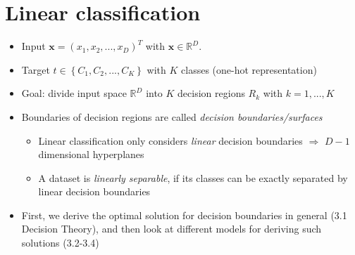 \section{Linear classification}
\begin{itemize}
	\item Input $\bm{x}=\left(x_1, x_2, ..., x_D\right)^T$ with $\bm{x}\in\mathbb{R}^D$.
	\item Target $t\in\left\{C_1, C_2, ..., C_K\right\}$ with $K$ classes (one-hot representation)
	\item Goal: divide input space $\mathbb{R}^D$ into $K$ decision regions $R_k$ with $k=1,...,K$
	\item Boundaries of decision regions are called \textit{decision boundaries/surfaces}
	\begin{itemize}
		\item Linear classification only considers \textit{linear} decision boundaries $\Rightarrow$ $D-1$ dimensional hyperplanes
		\item A dataset is \textit{linearly separable}, if its classes can be exactly separated by linear decision boundaries
	\end{itemize}
	\item First, we derive the optimal solution for decision boundaries in general (3.1 Decision Theory), and then look at different models for deriving such solutions (3.2-3.4) 
\end{itemize}
